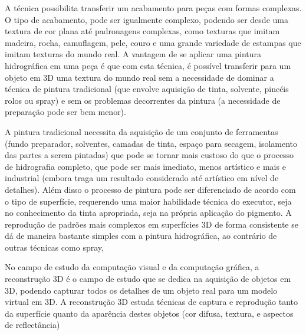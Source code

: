 A técnica possibilita transferir um acabamento para peças com formas complexas. O tipo de acabamento, pode ser igualmente complexo, podendo ser desde uma textura de cor plana até padronagens complexas, como texturas que imitam madeira, rocha, camuflagem, pele, couro e uma grande variedade de estampas que imitam texturas do mundo real.
A vantagem de se aplicar uma pintura hidrográfica em uma peça é que com esta técnica, é possível transferir para um objeto em 3D uma textura do mundo real sem a necessidade de dominar a técnica de pintura tradicional (que envolve aquisição de tinta, solvente, pincéis rolos ou spray) e sem os problemas decorrentes da pintura (a necessidade de preparação pode ser bem menor).

A pintura tradicional necessita da aquisição de um conjunto de ferramentas (fundo preparador, solventes, camadas de tinta, espaço para secagem, isolamento das partes a serem pintadas) que pode se tornar mais custoso do que o processo de hidrografia completo, que pode ser mais imediato, menos artístico e mais e industrial (embora traga um resultado considerado até artístico em nível de detalhes).
Além disso o processo de pintura pode ser diferenciado de acordo com o tipo de superfície, requerendo uma maior habilidade técnica do executor, seja no conhecimento da tinta apropriada, seja na própria aplicação do pigmento.
A reprodução de padrões mais complexos em superfícies 3D de forma consistente se dá de maneira bastante simples com a pintura hidrográfica, ao contrário de outras técnicas como spray,


No campo de estudo da computação visual e da computação gráfica, a reconstrução 3D é o campo de estudo que se dedica na aquisição de objetos em 3D, podendo capturar todos os detalhes de um objeto real para um modelo virtual em 3D. A reconstrução 3D estuda técnicas de captura e reprodução tanto da superfície quanto da aparência destes objetos (cor difusa, textura, e aspectos de reflectância)

